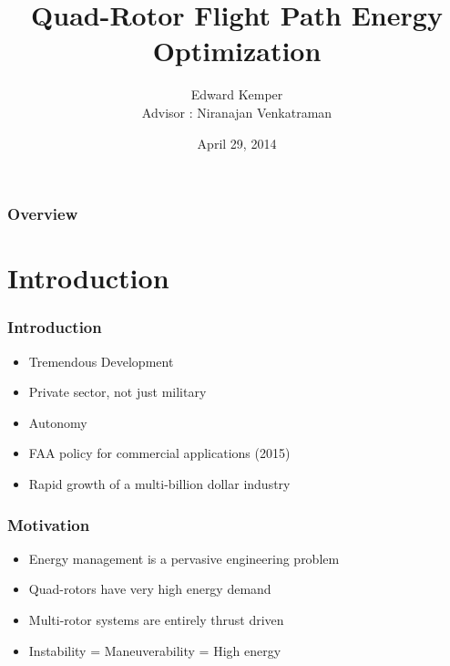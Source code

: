 \documentclass{beamer}
\title[Path-Energy Optimization]{Quad-Rotor Flight Path Energy Optimization}
\author{Edward Kemper\\Advisor : Niranajan Venkatraman} %
\institute[Northern Arizona University]
{
Northern Arizona University \\ %
\medskip
\textit{edwardkemper@gmail.com} %
\medskip
}
\date{April 29, 2014}
\begin{document}
\begin{frame}
\titlepage %


\end{frame}



\begin{frame}
\frametitle{Overview}
\tableofcontents
\end{frame}


\section{Introduction}

\begin{frame}
\frametitle{Introduction}
\begin{itemize}
\item Tremendous Development
\item Private sector, not just military
\item Autonomy
\item FAA policy for commercial applications (2015)
\item Rapid growth of a multi-billion dollar industry
\end{itemize}
\end{frame}



\begin{frame}
\frametitle{Motivation}
\begin{itemize}
\item Energy management is a pervasive engineering problem
\item Quad-rotors have very high energy demand
\item Multi-rotor systems are entirely thrust driven
\item Instability = Maneuverability = High energy

\end{itemize}
\end{frame}
\end{document}
